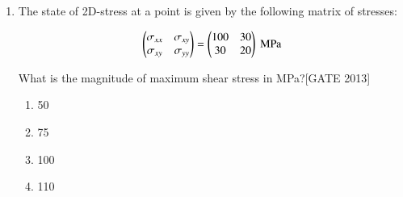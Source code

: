 \documentclass[journal,12pt,onecolumn]{IEEEtran}
\theoremstyle{remark}
\begin{document}
\begin{enumerate}
    \begin{multicols}{2}
    \begin{enumerate}
        \item 30$\degree$
        \item 150$\degree$
        \item 210$\degree$
        \item 330$\degree$
    \end{enumerate}
    \end{multicols}

  

\item The state of 2D-stress at a point is given by the following matrix of stresses:

\begin{align*}
    \begin{pmatrix}\sigma_{xx} & \sigma_{xy} \\
\sigma_{xy} & \sigma_{yy}
\end{pmatrix}
=
\begin{pmatrix}
100 & 30 \\
30 & 20\end{pmatrix} \text{ MPa}
\end{align*}



What is the magnitude of maximum shear stress in MPa?\hfill{[GATE 2013]}
\begin{multicols}{4}
\begin{enumerate}
    \item 50
    \item 75
    \item 100
    \item110
\end{enumerate}
\end{multicols}


\end{enumerate}
\end{document}
